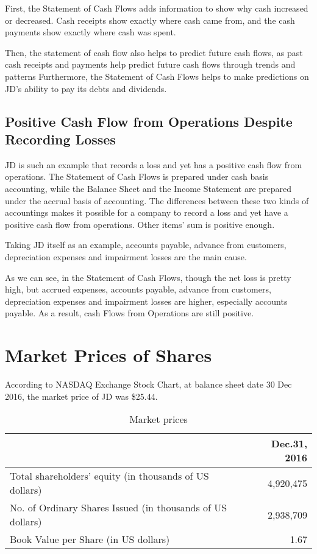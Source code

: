First, the Statement of Cash Flows adds information to show why cash increased or decreased. Cash receipts show exactly where cash came from, and the cash payments show exactly where cash was spent. 

Then, the statement of cash flow also helps to predict future cash flows, as past cash receipts and payments help predict future cash flows through trends and patterns
Furthermore, the Statement of Cash Flows helps to make predictions on JD’s ability to pay its debts and dividends. 

\subsection{Positive Cash Flow from Operations Despite Recording Losses}
JD is such an example that records a loss and yet has a positive cash flow from operations. The Statement of Cash Flows is prepared under cash basis accounting, while the Balance Sheet and the Income Statement are prepared under the accrual basis of accounting. The differences between these two kinds of accountings makes it possible for a company to record a loss and yet have a positive cash flow from operations. Other items’ sum is positive enough.

Taking JD itself as an example, accounts payable, advance from customers, depreciation expenses and impairment losses are the main cause. 

As we can see, in the Statement of Cash Flows, though the net loss is pretty high, but accrued expenses, accounts payable, advance from customers, depreciation expenses and impairment losses are higher, especially accounts payable. As a result, cash Flows from Operations are still positive.

\section{Market Prices of Shares}
According to NASDAQ Exchange Stock Chart, at balance sheet date 30 Dec 2016, the market price of JD was \$25.44.

\begin{table}[H]	
	\begin{center}
		\begin{tabular}{p{11cm}r}
			\toprule
			&\textbf{Dec.31, 2016}\\
			\midrule
			Total shareholders’ equity (in thousands of US dollars)&	4,920,475\\
			No. of Ordinary Shares Issued (in thousands of US dollars) &	2,938,709\\
			Book Value per Share (in US dollars) &	1.67\\
			\bottomrule
		\end{tabular}
	\end{center}
	\caption{Market prices}\label{table:1}
\end{table}

